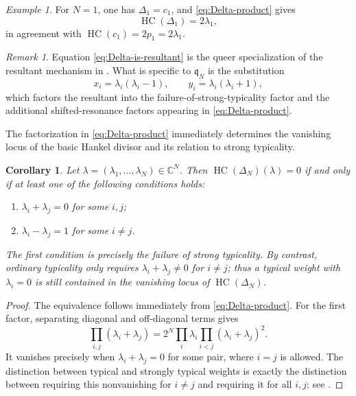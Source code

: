 \documentclass[11pt]{amsart}
\numberwithin{equation}{section}
\newtheorem{corollary}[theorem]{Corollary}
\theoremstyle{definition}
\theoremstyle{remark}
\newtheorem{remark}[theorem]{Remark}
\newtheorem{example}[theorem]{Example}
\newcommand{\C}{\mathbb C}
\newcommand{\q}{\mathfrak q}
\newcommand{\HC}{\operatorname{HC}}
\begin{document}
\begin{example}
For \(N=1\), one has \(\Delta_1=c_1\), and
\eqref{eq:Delta-product} gives
\[
 \HC(\Delta_1)=2\lambda_1,
\]
in agreement with \(\HC(c_1)=2p_1=2\lambda_1\).
\end{example}

\begin{remark}
Equation \eqref{eq:Delta-is-resultant} is the queer specialization of
the resultant mechanism in
\cite[Proposition~3, Equation~(5.6)]{KV2005}.  What is specific to
\(\q_N\) is the substitution
\[
x_i=\lambda_i(\lambda_i-1),
\qquad
y_i=\lambda_i(\lambda_i+1),
\]
which factors the resultant into the failure-of-strong-typicality
factor and the additional shifted-resonance factors appearing in
\eqref{eq:Delta-product}.
\end{remark} 

The factorization in \eqref{eq:Delta-product} immediately determines
the vanishing locus of the basic Hankel divisor and its relation to
strong typicality.

\begin{corollary}
\label{cor:Delta-typicality}
Let \(\lambda=(\lambda_1,\ldots,\lambda_N)\in\C^N\).  Then
\(\HC(\Delta_N)(\lambda)=0\) if and only if at least one of the
following conditions holds:
\begin{enumerate}
 \item \(\lambda_i+\lambda_j=0\) for some \(i,j\);
 \item \(\lambda_i-\lambda_j=1\) for some \(i\neq j\).
\end{enumerate}
The first condition is precisely the failure of \emph{strong
typicality}.  By contrast, ordinary typicality only requires
\(\lambda_i+\lambda_j\neq0\) for \(i\neq j\); thus a typical weight with
\(\lambda_i=0\) is still contained in the vanishing locus of
\(\HC(\Delta_N)\).
\end{corollary}

\begin{proof}
The equivalence follows immediately from \eqref{eq:Delta-product}.
For the first factor, separating diagonal and off-diagonal terms gives
\[
 \prod_{i,j}(\lambda_i+\lambda_j)
 =2^N\prod_i\lambda_i
  \prod_{i<j}(\lambda_i+\lambda_j)^2.
\]
It vanishes precisely when \(\lambda_i+\lambda_j=0\) for some pair,
where \(i=j\) is allowed.  The distinction between typical and strongly
typical weights is exactly the distinction between requiring this
nonvanishing for \(i\neq j\) and requiring it for all \(i,j\); see
\cite[Sec.~2]{FriskMazorchuk2009}.
\end{proof}
\end{document}
